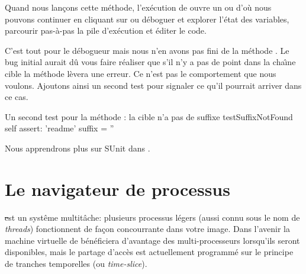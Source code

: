 \documentclass[a4paper,10pt,twoside]{book}
\begin{document}
Quand nous lan\c{c}ons cette m\'ethode, l'ex\'ecution de  ouvre un  ou \emph{} d'o\`u nous pouvons continuer 
en cliquant sur 
ou d\'eboguer et explorer l'\'etat des variables, parcourir pas-\`a-pas la pile d'ex\'ecution et \'editer le code.

C'est tout pour le d\'ebogueur mais nous n'en avons pas fini de la m\'ethode .
Le bug initial aurait d\^u vous faire r\'ealiser que s'il n'y a pas de point dans la cha\^{\i}ne cible la m\'ethode  l\`evera une erreur.
Ce n'est pas le comportement que nous voulons. Ajoutons ainsi un second test
pour signaler ce qu'il pourrait arriver dans ce cas.  

\begin{method}[testNoSuffix]{Un second test pour la m\'ethode : la cible n'a pas de suffixe}
testSuffixNotFound
	self assert: 'readme' suffix = ''
\end{method}



Nous apprendrons plus sur SUnit dans .


\section{Le navigateur de processus}

\st est un syst\^eme multit\^ache: plusieurs processus l\'egers (aussi
connu sous le nom de \emph{threads}) fonctionnent de fa\c{c}on concourrante
dans votre image.
Dans l'avenir la machine virtuelle de \sq b\'en\'eficiera d'avantage
des multi-processeurs lorsqu'ils seront disponibles, mais le partage
d'acc\`es est actuellement programm\'e sur le principe de
 tranches temporelles (ou \emph{time-slice}).
\end{document}
